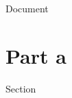 \documentclass{article}
\begin{document}
Document

\section*{Part a}

Section


% 
% 
\end{document}
